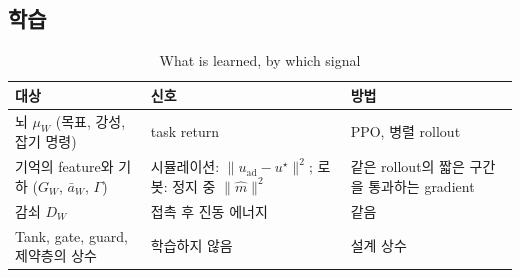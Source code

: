 \documentclass[11pt]{article}\usepackage[margin=1in]{geometry}\usepackage{amsmath,amssymb,amsthm,mathtools}\usepackage{graphicx}\graphicspath{{figures/}{../figures/}{figs/}{./}}\usepackage{enumitem}\usepackage{hyperref}\usepackage{cleveref}\usepackage{tikz}\usetikzlibrary{arrows.meta,positioning,calc,shapes.geometric}\usepackage{float}\usepackage{rotating}\usepackage[most]{tcolorbox}\usepackage{kotex}\usepackage{booktabs}\usepackage{longtable}\emergencystretch=1.6em\tolerance=2000 \crefname{assumption}{Assumption}{Assumptions}\Crefname{assumption}{Assumption}{Assumptions}\crefname{definition}{Definition}{Definitions}\Crefname{definition}{Definition}{Definitions}\crefname{proposition}{Proposition}{Propositions}\Crefname{proposition}{Proposition}{Propositions}\crefname{fact}{Fact}{Facts}\Crefname{fact}{Fact}{Facts} \newtheorem{assumption}{Assumption}\newtheorem{definition}{Definition}\newtheorem{lemma}{Lemma}\newtheorem{proposition}{Proposition}\newtheorem{theorem}{Theorem}\newtheorem{corollary}{Corollary}\newtheorem{fact}{Fact}\theoremstyle{remark}\newtheorem{remark}{Remark} \newcommand{\R}{\mathbb{R}}\newcommand{\xb}{\bar x}\newcommand{\Ab}{\bar A}\newcommand{\By}{\bar B_y}\newcommand{\U}{\mathcal U}\newcommand{\Z}{\mathcal Z}
\begin{document}
\subsection{학습}
\label{sec:learnplan}

\begin{table}[H]
\centering\footnotesize
\caption{What is learned, by which signal}
\label{tab:learnplan}
\begin{tabular}{p{4.0cm}p{5.2cm}p{5.0cm}}
\toprule
대상 & 신호 & 방법 \\
\midrule
뇌 $\mu_W$ (목표, 강성, 잡기 명령) & task return & PPO, 병렬 rollout \\
기억의 feature와 기하 ($G_W$, $\bar a_W$, $\Gamma$) & 시뮬레이션: $\|u_{\mathrm{ad}}-u^\star\|^2$; 로봇: 정지 중 $\|\hat m\|^2$ & 같은 rollout의 짧은 구간을 통과하는 gradient \\
감쇠 $D_W$ & 접촉 후 진동 에너지 & 같음 \\
Tank, gate, guard, 제약층의 상수 & 학습하지 않음 & 설계 상수 \\
\bottomrule
\end{tabular}
\end{table}
\end{document}
